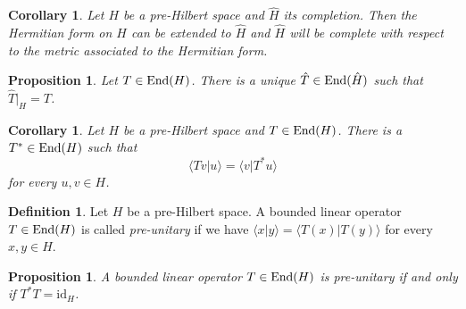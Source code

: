 \documentclass[12pt]{article}
\newtheorem{prop}[thm]{Proposition}
\newtheorem{corollary}[thm]{Corollary}
\theoremstyle{definition}
\newtheorem{dfn}[thm]{Definition}
\theoremstyle{remark}
\newcommand{\End}[1]{\textup{End}(#1)}
\begin{document}
    \begin{corollary}
        Let $H$ be a pre-Hilbert space and $\hat{H}$ its completion. Then the Hermitian form on $H$ can be extended to $\hat{H}$ and $\hat{H}$ will be complete with respect to the metric associated to the Hermitian form.
    \end{corollary}

    \begin{prop}
        Let $T\in\End{H}$. There is a unique $\hat T\in\End{\hat H}$ such that $\hat T|_H = T$.
    \end{prop}

    \begin{corollary}
        Let $H$ be a pre-Hilbert space and $T\in\End{H}$. There is a $T^*\in\End{H}$ such that
        $$
        \langle Tv|u \rangle = \langle v|T^*u \rangle
        $$
        for every $u,v\in H$.
    \end{corollary}

    \begin{dfn}
        Let $H$ be a pre-Hilbert space. A bounded linear operator $T\in\End{H}$ is called \emph{pre-unitary} if we have
        $\langle x|y \rangle = \langle T(x)|T(y) \rangle$
        for every $x,y\in H$.
    \end{dfn}

    \begin{prop}
        A bounded linear operator $T\in\End{H}$ is pre-unitary if and only if $T^*T=\text{id}_H$.
    \end{prop}
\end{document}
